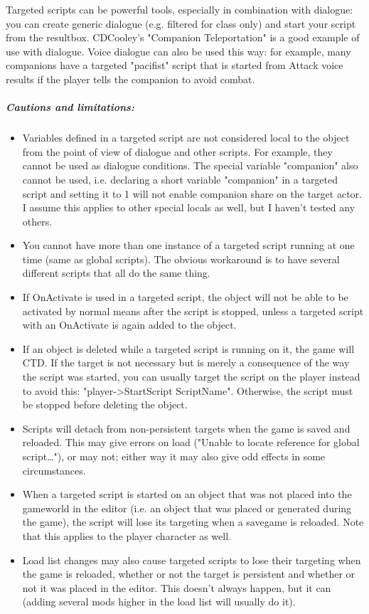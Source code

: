 \documentclass[
]{article}
\begin{document}
Targeted scripts can be powerful tools, especially in combination with
dialogue: you can create generic dialogue (e.g. filtered for class only)
and start your script from the resultbox. CDCooley's "Companion
Teleportation" is a good example of use with dialogue. Voice dialogue
can also be used this way: for example, many companions have a targeted
"pacifist" script that is started from Attack voice results if the
player tells the companion to avoid combat.

\hypertarget{cautions-and-limitations}{%
\subparagraph{Cautions and
limitations:}\label{cautions-and-limitations}}

\begin{itemize}
\item
  Variables defined in a targeted script are not considered local to the
  object from the point of view of dialogue and other scripts. For
  example, they cannot be used as dialogue conditions. The special
  variable "companion" also cannot be used, i.e. declaring a short
  variable "companion" in a targeted script and setting it to 1 will not
  enable companion share on the target actor. I assume this applies to
  other special locals as well, but I haven't tested any others.
\item
  You cannot have more than one instance of a targeted script running at
  one time (same as global scripts). The obvious workaround is to have
  several different scripts that all do the same thing.
\item
  If OnActivate is used in a targeted script, the object will not be
  able to be activated by normal means after the script is stopped,
  unless a targeted script with an OnActivate is again added to the
  object.
\item
  If an object is deleted while a targeted script is running on it, the
  game will CTD. If the target is not necessary but is merely a
  consequence of the way the script was started, you can usually target
  the script on the player instead to avoid this:
  "player-\textgreater StartScript ScriptName". Otherwise, the script
  must be stopped before deleting the object.
\item
  Scripts will detach from non-persistent targets when the game is saved
  and reloaded. This may give errors on load ("Unable to locate
  reference for global script\ldots"), or may not; either way it may
  also give odd effects in some circumstances.
\item
  When a targeted script is started on an object that was not placed
  into the gameworld in the editor (i.e. an object that was placed or
  generated during the game), the script will lose its targeting when a
  savegame is reloaded. Note that this applies to the player character
  as well.
\item
  Load list changes may also cause targeted scripts to lose their
  targeting when the game is reloaded, whether or not the target is
  persistent and whether or not it was placed in the editor. This
  doesn't always happen, but it can (adding several mods higher in the
  load list will usually do it).
\end{itemize}
\end{document}
